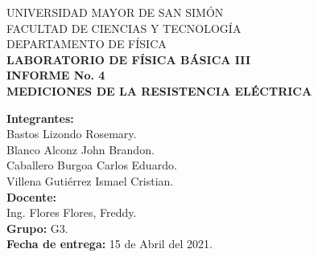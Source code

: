 \documentclass[letter,11pt]{article}
\begin{document}
\begin{titlepage}
\begin{center}
{\Large UNIVERSIDAD MAYOR DE SAN SIMÓN}\\
\vspace*{0.15cm}
{\large FACULTAD DE CIENCIAS Y TECNOLOGÍA}\\
\vspace*{0.10cm}
DEPARTAMENTO DE FÍSICA\\
\vspace*{3.0cm}
{\Large \textbf{LABORATORIO DE FÍSICA BÁSICA III}}\\
\vspace*{0.3cm}
{\Large \textbf{INFORME No. 4}}\\
\vspace*{3.5cm}
{\Large \textbf{MEDICIONES DE LA RESISTENCIA ELÉCTRICA}}\\
\end{center}

\vspace*{5.8cm}
\leftskip=7.95cm
\noindent
\textbf{Integrantes:}\\
Bastos Lizondo Rosemary.\\
Blanco Alconz John Brandon.\\
Caballero Burgoa Carlos Eduardo.\\
Villena Gutiérrez Ismael Cristian.\\
\newline
\textbf{Docente:}\\
Ing. Flores Flores, Freddy.\\
\newline
\textbf{Grupo:} G3.\\
\textbf{Fecha de entrega:} 15 de Abril del 2021.\\

\end{titlepage}
\end{document}
